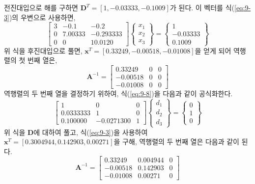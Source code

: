 전진대입으로 해를 구하면 $\mathbf{D}^{T}=[1,-0.03333,-0.1009]$가 된다. 이 벡터를 식(\ref{eq:9-3})의 우변으로 사용하면,
\begin{equation*}
\begin{bmatrix}3&-0.1&-0.2\\0&7.00333&-0.293333\\0&0&10.0120\end{bmatrix}\begin{Bmatrix}x_{1}\\x_{2}\\x_{3}\end{Bmatrix}=\begin{Bmatrix}1\\-0.03333\\0.1009\end{Bmatrix}
\end{equation*}
위 식을 후진대입으로 풀면, $\mathbf{x}^{T}=[0.33249,-0.00518,-0.01008]$을 얻게 되어 역행렬의 첫 번째 열은,
\begin{equation*}
\mathbf{A}^{-1}=\begin{bmatrix}0.33249&0&0\\-0.00518&0&0\\-0.01008&0&0\end{bmatrix}
\end{equation*}
역행렬의 두 번째 열을 결정하기 위하여, 식(\ref{eq:9-8})을 다음과 같이 공식화한다.
\begin{equation*}
\begin{bmatrix}1&0&0\\0.0333333&1&0\\0.100000&-0.0271300&1\end{bmatrix}\begin{Bmatrix}d_{1}\\d_{2}\\d_{3}\end{Bmatrix}=\begin{Bmatrix}0\\1\\0\end{Bmatrix}
\end{equation*}
위 식을 $\mathbf{D}$에 대하여 풀고, 식(\ref{eq:9-3})을 사용하여 $\mathbf{x}^{T}=[0.3004944,0.142903,0.00271]$을 구해, 역행렬의 두 번째 열은 다음과 같이 된다.
\begin{equation*}
\mathbf{A}^{-1}=\begin{bmatrix}0.33249&0.004944&0\\-0.00518&0.142903&0\\-0.01008&0.00271&0\end{bmatrix}
\end{equation*}

